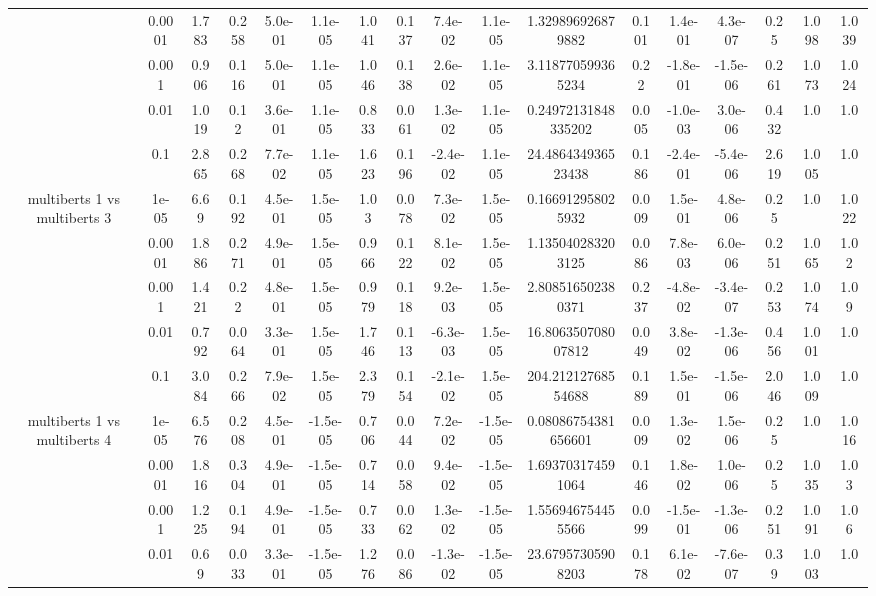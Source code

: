 \begin{tabular}{|c|c|c|c|c|c|c|c|c|c|c|c|c|c|c|c|c|}
 & 0.0001 & 1.783 & 0.258 & 5.0e-01 & 1.1e-05 & 1.041 & 0.137 & 7.4e-02 & 1.1e-05 & 1.329896926879882 & 0.101 & 1.4e-01 & 4.3e-07 & 0.25 & 1.098 & 1.039 \\
 & 0.001 & 0.906 & 0.116 & 5.0e-01 & 1.1e-05 & 1.046 & 0.138 & 2.6e-02 & 1.1e-05 & 3.118770599365234 & 0.22 & -1.8e-01 & -1.5e-06 & 0.261 & 1.073 & 1.024 \\
 & 0.01 & 1.019 & 0.12 & 3.6e-01 & 1.1e-05 & 0.833 & 0.061 & 1.3e-02 & 1.1e-05 & 0.24972131848335202 & 0.005 & -1.0e-03 & 3.0e-06 & 0.432 & 1.0 & 1.0 \\
 & 0.1 & 2.865 & 0.268 & 7.7e-02 & 1.1e-05 & 1.623 & 0.196 & -2.4e-02 & 1.1e-05 & 24.486434936523438 & 0.186 & -2.4e-01 & -5.4e-06 & 2.619 & 1.005 & 1.0 \\
\hline
\multirow{5}{*}{multiberts 1 vs multiberts 3} & 1e-05 & 6.69 & 0.192 & 4.5e-01 & 1.5e-05 & 1.03 & 0.078 & 7.3e-02 & 1.5e-05 & 0.166912958025932 & 0.009 & 1.5e-01 & 4.8e-06 & 0.25 & 1.0 & 1.022 \\
 & 0.0001 & 1.886 & 0.271 & 4.9e-01 & 1.5e-05 & 0.966 & 0.122 & 8.1e-02 & 1.5e-05 & 1.135040283203125 & 0.086 & 7.8e-03 & 6.0e-06 & 0.251 & 1.065 & 1.02 \\
 & 0.001 & 1.421 & 0.22 & 4.8e-01 & 1.5e-05 & 0.979 & 0.118 & 9.2e-03 & 1.5e-05 & 2.808516502380371 & 0.237 & -4.8e-02 & -3.4e-07 & 0.253 & 1.074 & 1.09 \\
 & 0.01 & 0.792 & 0.064 & 3.3e-01 & 1.5e-05 & 1.746 & 0.113 & -6.3e-03 & 1.5e-05 & 16.806350708007812 & 0.049 & 3.8e-02 & -1.3e-06 & 0.456 & 1.001 & 1.0 \\
 & 0.1 & 3.084 & 0.266 & 7.9e-02 & 1.5e-05 & 2.379 & 0.154 & -2.1e-02 & 1.5e-05 & 204.21212768554688 & 0.189 & 1.5e-01 & -1.5e-06 & 2.046 & 1.009 & 1.0 \\
\hline
\multirow{5}{*}{multiberts 1 vs multiberts 4} & 1e-05 & 6.576 & 0.208 & 4.5e-01 & -1.5e-05 & 0.706 & 0.044 & 7.2e-02 & -1.5e-05 & 0.08086754381656601 & 0.009 & 1.3e-02 & 1.5e-06 & 0.25 & 1.0 & 1.016 \\
 & 0.0001 & 1.816 & 0.304 & 4.9e-01 & -1.5e-05 & 0.714 & 0.058 & 9.4e-02 & -1.5e-05 & 1.693703174591064 & 0.146 & 1.8e-02 & 1.0e-06 & 0.25 & 1.035 & 1.03 \\
 & 0.001 & 1.225 & 0.194 & 4.9e-01 & -1.5e-05 & 0.733 & 0.062 & 1.3e-02 & -1.5e-05 & 1.556946754455566 & 0.099 & -1.5e-01 & -1.3e-06 & 0.251 & 1.091 & 1.06 \\
 & 0.01 & 0.69 & 0.033 & 3.3e-01 & -1.5e-05 & 1.276 & 0.086 & -1.3e-02 & -1.5e-05 & 23.67957305908203 & 0.178 & 6.1e-02 & -7.6e-07 & 0.39 & 1.003 & 1.0 \\

\end{tabular}
